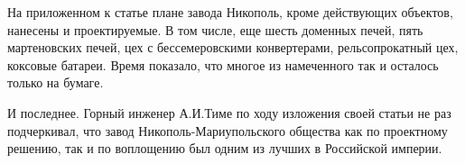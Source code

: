 На приложенном к статье плане завода Никополь, кроме действующих объектов,
нанесены и проектируемые. В том числе, еще шесть доменных печей, пять
мартеновских печей, цех с бессемеровскими конвертерами, рельсопрокатный цех,
коксовые батареи. Время показало, что многое из намеченного так и осталось
только на бумаге.

И последнее. Горный инженер А.И.Тиме по ходу изложения своей статьи не раз
подчеркивал, что завод Никополь-Мариупольского общества как по проектному
решению, так и по воплощению был одним из лучших в Российской империи.
